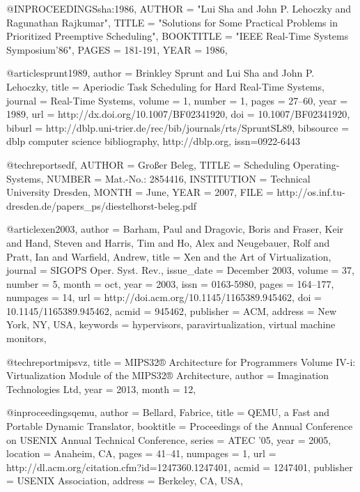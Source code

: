 @INPROCEEDINGS{sha:1986,
AUTHOR = "Lui Sha and John P. Lehoczky and Ragunathan Rajkumar",
TITLE = "Solutions for Some Practical Problems in Prioritized Preemptive Scheduling",
BOOKTITLE = "IEEE Real-Time Systems Symposium'86",
PAGES = {181-191},
YEAR = {1986}, 
}

@article{sprunt1989,
author    = {Brinkley Sprunt and Lui Sha and John P. Lehoczky},
title     = {Aperiodic Task Scheduling for Hard Real-Time Systems},
journal   = {Real-Time Systems},
volume    = {1},
number    = {1},
pages     = {27--60},
year      = {1989},
url       = {http://dx.doi.org/10.1007/BF02341920},
doi       = {10.1007/BF02341920},
biburl    = {http://dblp.uni-trier.de/rec/bib/journals/rts/SpruntSL89},
bibsource = {dblp computer science bibliography, http://dblp.org},
issn={0922-6443}
}

@techreport{sedf,
  AUTHOR =        {Großer Beleg},
  TITLE =         {Scheduling Operating-Systems},
  NUMBER =        {Mat.-No.: 2854416},
  INSTITUTION =   {Technical University Dresden},
  MONTH =         {June},
  YEAR  =         {2007},
  FILE  =         {http://os.inf.tu-dresden.de/papers\_ps/diestelhorst-beleg.pdf}
}


@article{xen2003,
 author = {Barham, Paul and Dragovic, Boris and Fraser, Keir and Hand, Steven and Harris, Tim and Ho, Alex and Neugebauer, Rolf and Pratt, Ian and Warfield, Andrew},
 title = {Xen and the Art of Virtualization},
 journal = {SIGOPS Oper. Syst. Rev.},
 issue_date = {December 2003},
 volume = {37},
 number = {5},
 month = oct,
 year = {2003},
 issn = {0163-5980},
 pages = {164--177},
 numpages = {14},
 url = {http://doi.acm.org/10.1145/1165389.945462},
 doi = {10.1145/1165389.945462},
 acmid = {945462},
 publisher = {ACM},
 address = {New York, NY, USA},
 keywords = {hypervisors, paravirtualization, virtual machine monitors},
} 

@techreport{mipsvz,
     title = {{MIPS32® Architecture for Programmers Volume IV-i: Virtualization Module of the MIPS32® Architecture}},
     author = {{Imagination Technologies Ltd}},
     year = {2013},
     month = {12},
}

@inproceedings{qemu,
 author = {Bellard, Fabrice},
 title = {QEMU, a Fast and Portable Dynamic Translator},
 booktitle = {Proceedings of the Annual Conference on USENIX Annual Technical Conference},
 series = {ATEC '05},
 year = {2005},
 location = {Anaheim, CA},
 pages = {41--41},
 numpages = {1},
 url = {http://dl.acm.org/citation.cfm?id=1247360.1247401},
 acmid = {1247401},
 publisher = {USENIX Association},
 address = {Berkeley, CA, USA},
} 

